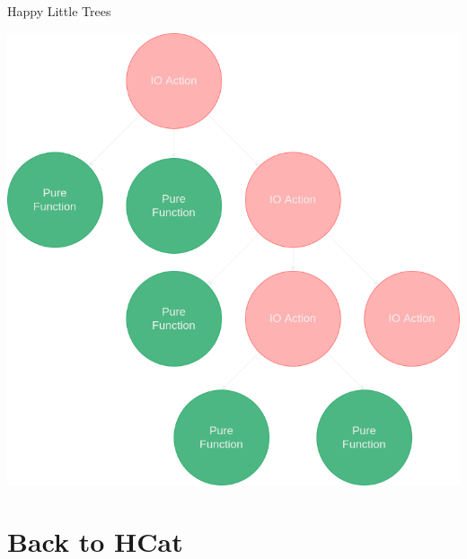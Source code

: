 \documentclass[10pt, presentation, colorlinks]{beamer}
\begin{document}
\begin{frame}[label={sec:org9149b75}]{Happy Little Trees}
\begin{center}
\includegraphics[height=0.6\textheight]{img/tree.png}
\end{center}
\end{frame}

\section{Back to HCat}
\label{sec:orgeab600a}
\end{document}
